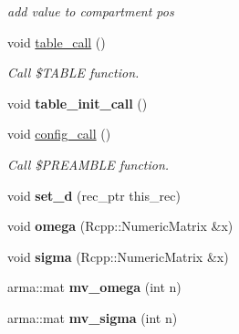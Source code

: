 \begin{DoxyCompactItemize}
\begin{DoxyCompactList}\small\item\em add {\ttfamily value} to compartment {\ttfamily pos} \end{DoxyCompactList}\item 
\mbox{\label{classodeproblem_a62371ab3a7331c680da61c34e0a77390}} 
void \hyperlink{classodeproblem_a62371ab3a7331c680da61c34e0a77390}{table\+\_\+call} ()
\begin{DoxyCompactList}\small\item\em Call {\ttfamily \$\+T\+A\+B\+LE} function. \end{DoxyCompactList}\item 
\mbox{\label{classodeproblem_a5671e548c6e81afd353a45b4b3c845af}} 
void {\bfseries table\+\_\+init\+\_\+call} ()
\item 
\mbox{\label{classodeproblem_a23ba805e57f18ec631645247c631c0ac}} 
void \hyperlink{classodeproblem_a23ba805e57f18ec631645247c631c0ac}{config\+\_\+call} ()
\begin{DoxyCompactList}\small\item\em Call {\ttfamily \$\+P\+R\+E\+A\+M\+B\+LE} function. \end{DoxyCompactList}\item 
\mbox{\label{classodeproblem_a40b09d94a66b474fd65213e415ddc969}} 
void {\bfseries set\+\_\+d} (rec\+\_\+ptr this\+\_\+rec)
\item 
\mbox{\label{classodeproblem_a7d4724eff5756cd90aa4d8d7571b932e}} 
void {\bfseries omega} (Rcpp\+::\+Numeric\+Matrix \&x)
\item 
\mbox{\label{classodeproblem_abb8cdbe6d433204cb209405789b521f8}} 
void {\bfseries sigma} (Rcpp\+::\+Numeric\+Matrix \&x)
\item 
\mbox{\label{classodeproblem_a2827c3ef1ce3acaa967dd6e315debfe3}} 
arma\+::mat {\bfseries mv\+\_\+omega} (int n)
\item 
\mbox{\label{classodeproblem_aa7d69c4024cf6783ce7c2556367a0675}} 
arma\+::mat {\bfseries mv\+\_\+sigma} (int n)
\item 

\end{DoxyCompactItemize}
